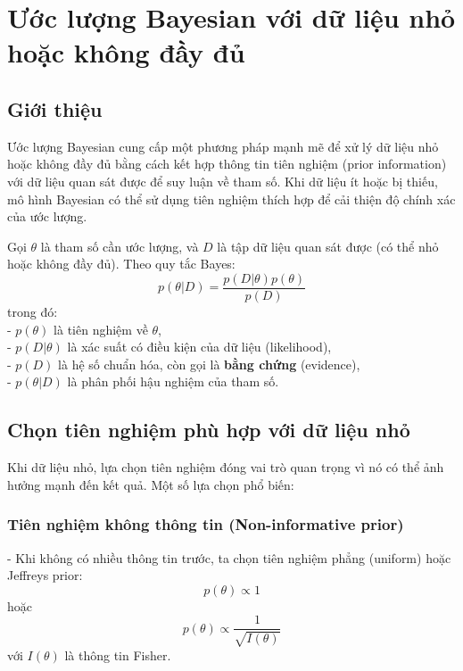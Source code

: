 \chapter{Ước lượng Bayesian với dữ liệu nhỏ hoặc không đầy đủ}

\section{Giới thiệu}
Ước lượng Bayesian cung cấp một phương pháp mạnh mẽ để xử lý dữ liệu nhỏ hoặc không đầy đủ bằng cách kết hợp thông tin tiên nghiệm (prior information) với dữ liệu quan sát được để suy luận về tham số. Khi dữ liệu ít hoặc bị thiếu, mô hình Bayesian có thể sử dụng tiên nghiệm thích hợp để cải thiện độ chính xác của ước lượng.

Gọi $\theta$ là tham số cần ước lượng, và $D$ là tập dữ liệu quan sát được (có thể nhỏ hoặc không đầy đủ). Theo quy tắc Bayes:
\begin{equation}
    p(\theta | D) = \frac{p(D | \theta) p(\theta)}{p(D)}
\end{equation}
trong đó:\\
- $p(\theta)$ là tiên nghiệm về $\theta$,\\
- $p(D | \theta)$ là xác suất có điều kiện của dữ liệu (likelihood),\\
- $p(D)$ là hệ số chuẩn hóa, còn gọi là \textbf{bằng chứng} (evidence),\\
- $p(\theta | D)$ là phân phối hậu nghiệm của tham số.

\section{Chọn tiên nghiệm phù hợp với dữ liệu nhỏ}
Khi dữ liệu nhỏ, lựa chọn tiên nghiệm đóng vai trò quan trọng vì nó có thể ảnh hưởng mạnh đến kết quả. Một số lựa chọn phổ biến:

\subsection{Tiên nghiệm không thông tin (Non-informative prior)}
- Khi không có nhiều thông tin trước, ta chọn tiên nghiệm phẳng (uniform) hoặc Jeffreys prior:
  \begin{equation}
      p(\theta) \propto 1
  \end{equation}
  hoặc
  \begin{equation}
      p(\theta) \propto \frac{1}{\sqrt{I(\theta)}}
  \end{equation}
  với $I(\theta)$ là thông tin Fisher.

